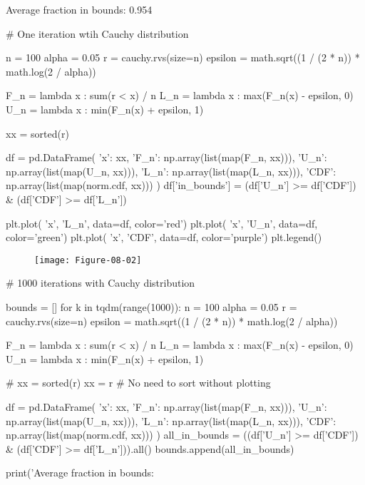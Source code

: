 \begin{console}
Average fraction in bounds: 0.954
\end{console}

\begin{python}
# One iteration wtih Cauchy distribution

n = 100
alpha = 0.05
r = cauchy.rvs(size=n)
epsilon = math.sqrt((1 / (2 * n)) * math.log(2 / alpha))

F_n = lambda x : sum(r < x) / n
L_n = lambda x : max(F_n(x) - epsilon, 0)
U_n = lambda x : min(F_n(x) + epsilon, 1)

xx = sorted(r)

df = pd.DataFrame({
    'x': xx, 
    'F_n': np.array(list(map(F_n, xx))), 
    'U_n': np.array(list(map(U_n, xx))), 
    'L_n': np.array(list(map(L_n, xx))), 
    'CDF': np.array(list(map(norm.cdf, xx)))
})
df['in_bounds'] = (df['U_n'] >= df['CDF']) & (df['CDF'] >= df['L_n'])

plt.plot( 'x', 'L_n', data=df, color='red')
plt.plot( 'x', 'U_n', data=df, color='green')
plt.plot( 'x', 'CDF', data=df, color='purple')
plt.legend()
\end{python}

\begin{figure}[H]
\texttt{[image: Figure-08-02]}
\end{figure}

\begin{python}
# 1000 iterations with Cauchy distribution

bounds = []
for k in tqdm(range(1000)):
    n = 100
    alpha = 0.05
    r = cauchy.rvs(size=n)
    epsilon = math.sqrt((1 / (2 * n)) * math.log(2 / alpha))

    F_n = lambda x : sum(r < x) / n
    L_n = lambda x : max(F_n(x) - epsilon, 0)
    U_n = lambda x : min(F_n(x) + epsilon, 1)

    # xx = sorted(r)
    xx = r # No need to sort without plotting

    df = pd.DataFrame({
        'x': xx, 
        'F_n': np.array(list(map(F_n, xx))), 
        'U_n': np.array(list(map(U_n, xx))), 
        'L_n': np.array(list(map(L_n, xx))), 
        'CDF': np.array(list(map(norm.cdf, xx)))
    })
    all_in_bounds = ((df['U_n'] >= df['CDF']) & (df['CDF'] >= df['L_n'])).all()
    bounds.append(all_in_bounds)
    
print('Average fraction in bounds: %
\end{python}

